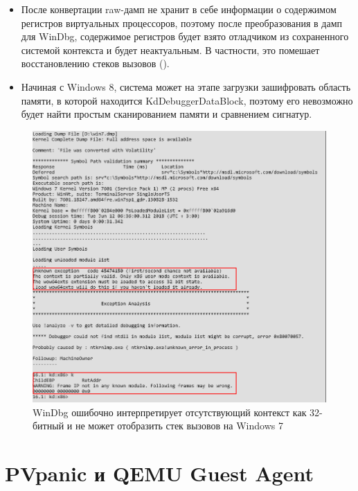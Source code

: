 \documentclass{mipt-thesis-bs}
\begin{document}
\begin{itemize}
    \item После конвертации raw-дамп не хранит в себе информации о содержимом регистров виртуальных процессоров, поэтому после преобразования в дамп для WinDbg, содержимое регистров будет взято отладчиком из сохраненного системой контекста и будет неактуальным. В частности, это помешает восстановлению стеков вызовов ().
    \item Начиная с Windows 8, система может на этапе загрузки зашифровать область памяти, в которой находится KdDebuggerDataBlock, поэтому его невозможно будет найти простым сканированием памяти и сравнением сигнатур.
\end{itemize}

\begin{figure}[h]
\begin{center}
    \captionsetup{justification=centering}
    \includegraphics[width=1\textwidth]{vol1.png}
    \caption{WinDbg ошибочно интерпретирует отсутствующий контекст как 32-битный и не может отобразить стек вызовов на Windows 7}
    \label{fig:windbg-vol}
\end{center}
\end{figure}

\newpage
\section*{PVpanic и QEMU Guest Agent}
\end{document}
